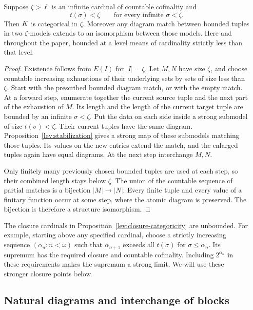 \begin{proposition}
\label{lev:closure-categoricity}
Suppose \(\zeta>\ell\) is an infinite cardinal of countable
cofinality and
\[
 t(\sigma)<\zeta\qquad\text{for every infinite }\sigma<\zeta.
\]
Then \(K\) is categorical in \(\zeta\). Moreover any diagram match
between bounded tuples in two \(\zeta\)-models extends to an
isomorphism between those models. Here and throughout the paper,
bounded at a level means of cardinality strictly less than that level.
\end{proposition}

\begin{proof}
Existence follows from \(E(I)\) for \(|I|=\zeta\). Let \(M,N\)
have size \(\zeta\), and choose countable increasing exhaustions of
their underlying sets by sets of size less than \(\zeta\).
Start with the prescribed bounded diagram match, or with the empty
match. At a forward step, enumerate together the current source
tuple and the next part of the exhaustion of \(M\). Its length and
the length of the current target tuple are bounded by an infinite
\(\sigma<\zeta\). Put the data on each side inside a strong
submodel of size \(t(\sigma)<\zeta\). Their current tuples have
the same diagram. Proposition~\ref{lev:stabilization} gives a
strong map of these submodels matching those tuples. Its values
on the new entries extend the match, and the enlarged tuples
again have equal diagrams. At the next step interchange \(M,N\).

Only finitely many previously chosen bounded tuples are used at
each step, so their combined length stays below \(\zeta\).
The union of the countable sequence of partial matches is a
bijection \(|M|\to|N|\). Every finite tuple and every value of a
finitary function occur at some step, where the atomic diagram
is preserved. The bijection is therefore a structure isomorphism.
\end{proof}

The closure cardinals in Proposition~\ref{lev:closure-categoricity}
are unbounded. For example, starting above any specified cardinal,
choose a strictly increasing sequence \((\alpha_n:n<\omega)\)
such that \(\alpha_{n+1}\) exceeds all \(t(\sigma)\) for
\(\sigma\le\alpha_n\). Its supremum has the required closure and
countable cofinality. Including \(2^{\alpha_n}\) in these requirements
makes the supremum a strong limit. We will use these stronger
closure points below.

\subsection{Natural diagrams and interchange of blocks}

